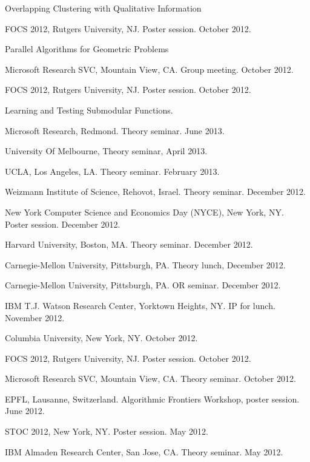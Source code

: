 \documentclass[11pt]{article}
\newenvironment{innerlist}[1][\enskip\textbullet]%
        {\begin{compactitem}[#1]}{\end{compactitem}}
\begin{document}
\begin{innerlist}
\item Overlapping Clustering with Qualitative Information
\begin{innerlist}
\item FOCS 2012, Rutgers University, NJ. Poster session. October 2012.
\end{innerlist}

\item Parallel Algorithms for Geometric Problems
\begin{innerlist}
\item Microsoft Research SVC, Mountain View, CA. Group meeting. October 2012.
\item FOCS 2012, Rutgers University, NJ. Poster session. October 2012.
\end{innerlist}

\item Learning and Testing Submodular Functions.
\begin{innerlist}
  \item Microsoft Research, Redmond. Theory seminar. June 2013.
  \item University Of Melbourne, Theory seminar, April 2013.
  \item UCLA, Los Angeles, LA. Theory seminar. February 2013.
  \item Weizmann Institute of Science, Rehovot, Israel. Theory seminar. December 2012.  
  \item New York Computer Science and Economics Day (NYCE), New York, NY. Poster session. December 2012.  
  \item Harvard University, Boston, MA. Theory seminar. December 2012.
  \item Carnegie-Mellon University, Pittsburgh, PA. Theory lunch, December 2012.
  \item Carnegie-Mellon University, Pittsburgh, PA. OR seminar. December 2012.
  \item IBM T.J. Watson Research Center, Yorktown Heights, NY. IP for lunch. November 2012.
  \item Columbia University, New York, NY. October 2012.
  \item FOCS 2012, Rutgers University, NJ. Poster session. October 2012.
  \item Microsoft Research SVC, Mountain View, CA. Theory seminar. October 2012.
  \item EPFL, Lausanne, Switzerland. Algorithmic Frontiers Workshop, poster session. June 2012.
  \item STOC 2012, New York, NY. Poster session. May 2012.
  \item IBM Almaden Research Center, San Jose, CA. Theory seminar. May 2012.
\end{innerlist}


\end{innerlist}
\end{document}
